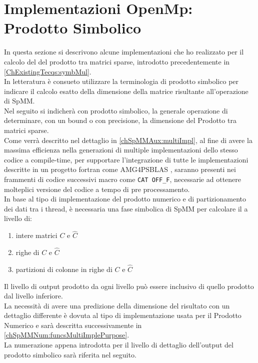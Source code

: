 \chapter[Implementazioni OpenMp: Prodotto Simbolico]
{Implementazioni OpenMp:\\Prodotto Simbolico}
\label{ChSymbProduct}\label{chSpMMSymb}
In questa sezione si descrivono alcune implementazioni che ho realizzato per 
il calcolo del \nnnz del prodotto tra matrici sparse, introdotto precedentemente in \ref{ChExistingTecqs:symbMul}.\\
In letteratura è consueto utilizzare la terminologia di prodotto simbolico 
per indicare il calcolo esatto della dimensione della matrice risultante all'operazione di SpMM.\\
Nel seguito si indicherà con prodotto simbolico, la generale operazione di determinare, 
con un bound o con precisione, la dimensione del Prodotto tra matrici sparse.\\
Come verrà descritto nel dettaglio in \ref{chSpMMAux:multiImpl}, 
al fine di avere la massima efficienza nella generazioni
di multiple implementazioni dello stesso codice a compile-time, 
per supportare l'integrazione di tutte le implementazioni descritte in un progetto fortran come AMG4PSBLAS  \amgforpsblas,
saranno presenti nei frammenti di codice successivi macro come \verb|CAT OFF_F|,
necessarie ad ottenere molteplici versione del codice a tempo di pre processamento.\\
\voidLine
\label{chSpMMSymb:outputDetailLevel} %
In base al tipo di implementazione del prodotto numerico e di partizionamento dei dati tra i thread,
è necessaria una fase simbolica di SpMM per calcolare il \nnnz a livello di:\\
\begin{enumerate}
	\item	
		intere matrici $C$ e $\hat{C}$
	\item 	righe di $C$ e $\hat{C}$
	\item 	partizioni di colonne in righe di $C$ e $\hat{C}$
\end{enumerate}
Il livello di output prodotto da ogni livello può essere inclusivo di quello prodotto dal livello inferiore.\\
La necessità di avere una predizione della dimensione del risultato con un dettaglio differente 
è dovuta al tipo di implementazione usata per il Prodotto Numerico e 
sarà descritta successivamente in \ref{chSpMMNum:funcsMultiImplePurpose}.\\
La numerazione appena introdotta per il livello di dettaglio dell'output del prodotto simbolico 
sarà riferita nel seguito.\\

